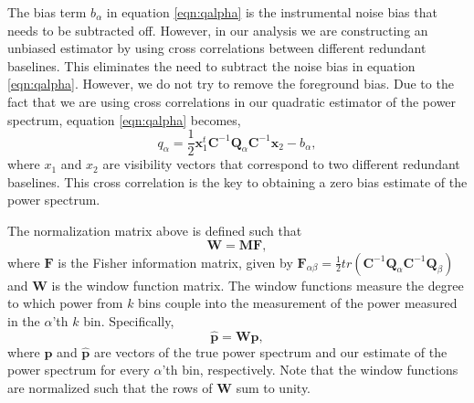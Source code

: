 \documentclass[twocolumn,numberedappendix]{emulateapj} \shorttitle{PSA64}
\newcommand{\x}{\mathbf{x}} \newcommand{\xhat}{\hat{\mathbf{x}}}
\begin{document}
The bias term $b_{\alpha}$ in equation \ref{eqn:qalpha} is the instrumental
noise bias that needs to be subtracted off. However, in our analysis we are
constructing an unbiased estimator by using cross correlations between different
redundant baselines. This eliminates the need to subtract the noise bias in
equation \ref{eqn:qalpha}. However, we do not try to remove the 
foreground bias.  Due to the fact that we are using cross correlations in our
quadratic estimator of the power spectrum, equation \ref{eqn:qalpha} becomes, 
\begin{equation}\label{eqn:qalpha_unbiased}
    q_{\alpha} =
\frac{1}{2}\x_{1}^{t}\mathbf{C}^{-1}\mathbf{Q}_{\alpha}\mathbf{C}^{-1}\x_{2} - b_{\alpha},
\end{equation}
where $x_{1}$ and $x_{2}$ are visibility vectors that correspond to two
different redundant baselines. This cross correlation is the key to obtaining a
zero bias estimate of the power spectrum. 

The normalization matrix above is defined such that
\begin{equation}\label{eqn:window_def}
    \mathbf{W} = \mathbf{M}\mathbf{F}, 
\end{equation}
where $\mathbf{F}$ is the Fisher information matrix, given by
$\mathbf{F}_{\alpha\beta} =
\frac{1}{2}tr(\mathbf{C}^{-1}\mathbf{Q}_{\alpha}\mathbf{C}^{-1}\mathbf{Q}_{\beta})$
and $\mathbf{W}$ is the window function matrix. The window functions measure the
degree to which power from $k$ bins couple into the measurement of the power
measured in the $\alpha$'th $k$ bin. Specifically, 
\begin{equation}\label{eqn:true_pspec_2_est_pspec}
    \hat{\mathbf{p}} = \mathbf{W}\mathbf{p}, 
\end{equation}
where $\mathbf{p}$ and $\hat{\mathbf{p}}$ are vectors of the true power spectrum and our
estimate of the power spectrum for every $\alpha$'th bin, respectively. Note
that the window functions are normalized such that the rows of $\mathbf{W}$ sum
to unity.
\end{document}
